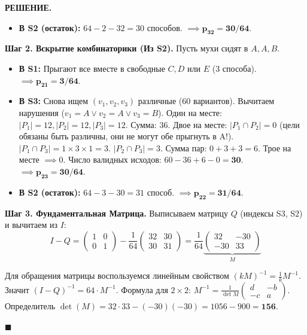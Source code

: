 \documentclass[12pt,a4paper]{article}
\newenvironment{solution}{
    \begin{tcolorbox}[
        enhanced, breakable, blanker,
        borderline west={2.5pt}{0pt}{solgray},
        left=12pt, top=5pt, bottom=5pt,
        before skip=10pt, after skip=15pt
    ]
    \textbf{\textsf{РЕШЕНИЕ.}}\;
}{
    \hfill $\blacksquare$
    \end{tcolorbox}
}
\begin{document}
\begin{solution}
\begin{itemize}
    \item \textbf{В S2 (остаток):} $64 - 2 - 32 = 30$ способов. $\implies \mathbf{p_{32} = 30/64}$.
\end{itemize}

\textbf{Шаг 2. Вскрытие комбинаторики (Из S2).} Пусть мухи сидят в $A, A, B$.
\begin{itemize}
    \item \textbf{В S1:} Прыгают все вместе в свободные $C, D$ или $E$ (3 способа). $\implies \mathbf{p_{21} = 3/64}$.
    
    \item \textbf{В S3:} Снова ищем $(v_1, v_2, v_3)$ различные (60 вариантов). Вычитаем нарушения ($v_1=A \lor v_2=A \lor v_3=B$).
    Один на месте: $|P_1| = 12, |P_2| = 12, |P_3| = 12$. Сумма: $36$.
    Двое на месте: $|P_1 \cap P_2| = 0$ (цели обязаны быть различны, они не могут обе прыгнуть в A!). 
    $|P_1 \cap P_3| = 1 \times 3 \times 1 = 3$. $|P_2 \cap P_3| = 3$. Сумма пар: $0 + 3 + 3 = 6$.
    Трое на месте $\implies 0$.
    Число валидных исходов: $60 - 36 + 6 - 0 = \mathbf{30}$. $\implies \mathbf{p_{23} = 30/64}$.
    
    \item \textbf{В S2 (остаток):} $64 - 3 - 30 = 31$ способ. $\implies \mathbf{p_{22} = 31/64}$.
\end{itemize}

\textbf{Шаг 3. Фундаментальная Матрица.}
Выписываем матрицу $Q$ (индексы S3, S2) и вычитаем из $I$:
\[ I - Q = \begin{pmatrix} 1 & 0 \\ 0 & 1 \end{pmatrix} - \frac{1}{64} \begin{pmatrix} 32 & 30 \\ 30 & 31 \end{pmatrix} = \frac{1}{64} \underbrace{\begin{pmatrix} 32 & -30 \\ -30 & 33 \end{pmatrix}}_{M} \]

Для обращения матрицы воспользуемся линейным свойством $(kM)^{-1} = \frac{1}{k} M^{-1}$. Значит $(I-Q)^{-1} = 64 \cdot M^{-1}$.
Формула для $2 \times 2$: $M^{-1} = \frac{1}{\det M} \begin{pmatrix} d & -b \\ -c & a \end{pmatrix}$.
Определитель $\det(M) = 32 \cdot 33 - (-30)(-30) = 1056 - 900 = \mathbf{156}$.


\end{solution}
\end{document}
